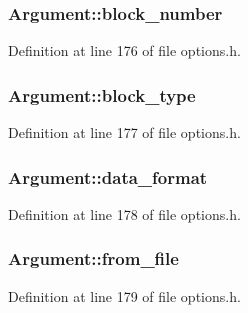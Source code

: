 \subsubsection[{\texorpdfstring{block\+\_\+number}{block_number}}]{ Argument\+::block\+\_\+number}\hypertarget{struct_argument_a049f87ad1e39070a2c97180b71f33374}{}\label{struct_argument_a049f87ad1e39070a2c97180b71f33374}


Definition at line 176 of file options.\+h.

\subsubsection[{\texorpdfstring{block\+\_\+type}{block_type}}]{ Argument\+::block\+\_\+type}\hypertarget{struct_argument_a696d94e74365133c31b44ed5f88285a3}{}\label{struct_argument_a696d94e74365133c31b44ed5f88285a3}


Definition at line 177 of file options.\+h.

\subsubsection[{\texorpdfstring{data\+\_\+format}{data_format}}]{ Argument\+::data\+\_\+format}\hypertarget{struct_argument_ab0be001da85138263582652cf41c6edb}{}\label{struct_argument_ab0be001da85138263582652cf41c6edb}


Definition at line 178 of file options.\+h.

\subsubsection[{\texorpdfstring{from\+\_\+file}{from_file}}]{ Argument\+::from\+\_\+file}\hypertarget{struct_argument_a920fcadf9f322c449651b54193e14ca1}{}\label{struct_argument_a920fcadf9f322c449651b54193e14ca1}


Definition at line 179 of file options.\+h.


